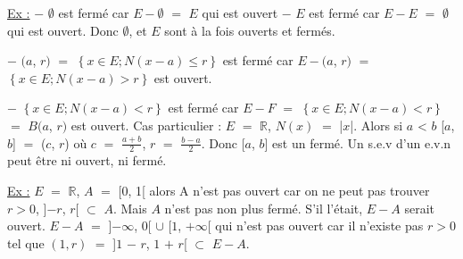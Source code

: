 \documentclass{article}
\begin{document}
\smallbreak
\underline{Ex :} \parindent=1cm \smallbreak
$-$ $\emptyset$ est fermé car $E - \emptyset$ $=$ $E$ qui est ouvert \smallbreak
$-$ $E$ est fermé car $E - E$ $=$ $\emptyset$ qui est ouvert.
\smallbreak
Donc $\emptyset$, et $E$ sont à la fois ouverts et fermés.
\smallbreak

$-$ \Bbarre$(a$, $r)$ $=$ $\left\{ x \in E; N(x - a) \leqslant r \right\}$ est fermé car $E -$\Bbarre$(a$, $r)$ $=$ $\left\{ x \in E; N(x - a) > r \right\}$ est ouvert.
\smallbreak 

$-$ $\left\{ x \in E; N(x - a) < r \right\}$ est fermé car $E - F$ $=$ $\left\{ x \in E; N(x - a) < r \right\}$ $=$ $B(a$, $r)$ est ouvert.
\smallbreak 
\newcommand{\R}{$\mathbb{R}$}
\newcommand{\C}{$\mathbb{C}$}
\newcommand{\NN}{$\mathbb{N}$}
\newcommand{\Nn}{$\mathbb{N}\text{ }$}
\newcommand{\Z}{$\mathbb{Z}$}
\newcommand{\Q}{$\mathbb{Q}$}
\newcommand{\D}{$\mathbb{D}$}
\newcommand{\E}{$E$ }
\newcommand{\Ep}{$E'$ }
\newcommand{\Nor}[1]{$N(#1)$}
\newcommand{\Noru}[1]{$N_1(#1)$}
\newcommand{\Nord}[1]{$N_2(#1)$}
\newcommand{\Nort}[1]{$N_3(#1)$}
\newcommand{\Norp}[1]{$N'(#1)$}
\newcommand{\Bo}[2]{$B\left( #1, #2 \right)$}
\newcommand{\Bf}[2]{\Bbarre$\left(#1, #2\right)$}
\newcommand{\N}{$N$}
\newcommand{\Np}{$N'$}
\newcommand{\Nu}{$N_1$}
\newcommand{\Nd}{$N_2$}
\newcommand{\Nt}{$N_3$}
\newcommand{\evn}{$(E$, $N)$ }
\newcommand{\evnpy}{$(E'$, $N)$ }
\newcommand{\evnyp}{$(E$, $N')$ }
\newcommand{\evnp}{$(E'$, $N')$ }
\newcommand{\evnps}{$(E'$, $N'')$ }
\newcommand{\evnsp}{$(E''$, $N')$ }
\newcommand{\evns}{$(E''$, $N'')$ }
\newcommand{\evnu}{$(E_1$, $N_1)$ }
\newcommand{\evnd}{$(E_2$, $N_2)$ }
\newcommand{\evnt}{$(E_3$, $N_3)$ }
\newcommand{\Rd}{\mathbb{R}^2}
\newcommand{\Rt}{\mathbb{R}^3}
\newcommand{\Rp}{\mathbb{R}^p}
\newcommand{\Cdeux}{\mathbb{C^2}}
\newcommand{\Ctrois}{\mathbb{C^3}}
\newcommand{\kinn}{k \in \mathbb{N}}
\newcommand{\ninn}{n \in \mathbb{N}}
\newcommand{\iini}{i \in I}
Cas particulier : \parindent=1.5cm \smallbreak $E$ $=$ \R, \Nor{x} $=$ |$x$|. Alors si $a$ < $b$ [$a$, $b$] $=$
\Bbarre($c$, $r$) où $c$ $=$ $\frac{a+b}{2}$, $r$ $=$ $\frac{b-a}{2}$. Donc [$a$, $b$] est un fermé. \smallbreak \parindent=0cm
Un s.e.v d'un e.v.n peut être ni ouvert, ni fermé.

\smallbreak
\underline{Ex :} \parindent=1cm \smallbreak 
\E$=$ \R,  $A$ $=$ [0, 1[ alors A n'est pas ouvert car on ne peut pas trouver $r>0$, ]$-r$, $r$[ $\subset$ $A$. Mais $A$ n'est pas \smallbreak non plus fermé. S'il l'était, $E - A$ serait ouvert. $E - A$ $=$ ]$-\infty$, $0$[ $\cup$ [$1$, $+\infty$[ qui n'est pas ouvert car il \smallbreak n'existe pas $r>0$ tel que \Bf{1}{r} $=$ ]$1$ $-$ $r$, $1$ $+$ $r$[ $\subset$ $E - A$.
\end{document}
